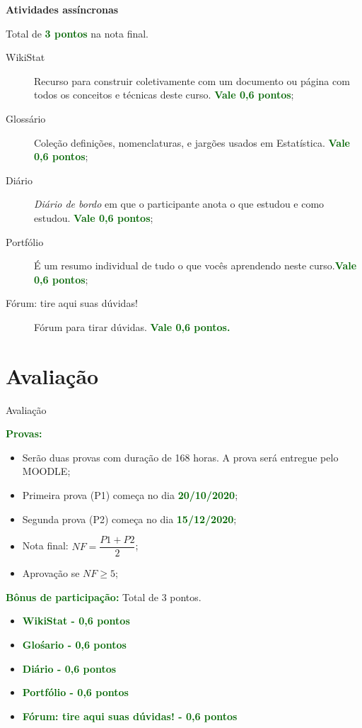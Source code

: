 \documentclass[9pt]{beamer}
\newcommand{\cc}[1]{\textcolor{darkgreen}{\bf #1}}
\begin{document}
\begin{frame}{}

\textbf{Atividades assíncronas}
\vfill


Total de \textcolor{darkgreen}{\bf 3 pontos} na nota final.
\begin{description}
	\item[WikiStat] Recurso para construir coletivamente com um documento ou página com todos os conceitos e técnicas deste curso. \textcolor{darkgreen}{\bf Vale 0,6 pontos};
	\item[Glossário] Coleção definições, nomenclaturas, e jargões usados em Estatística. \textcolor{darkgreen}{\bf Vale 0,6 pontos};
	\item[Diário] \textit{Diário de bordo} em que o participante anota o que estudou e como estudou. \textcolor{darkgreen}{\bf  Vale 0,6 pontos};
	\item[Portfólio] É um resumo individual de tudo o que vocês aprendendo neste curso.\textcolor{darkgreen}{\bf Vale 0,6 pontos};
	\item[Fórum: tire aqui suas dúvidas!] Fórum para tirar dúvidas. \textcolor{darkgreen}{\bf Vale 0,6 pontos.}
\end{description}


\normalsize
\end{frame}

\section{Avaliação}

\begin{frame}{Avaliação}

\cc{Provas:}

\begin{itemize}
	\item Serão duas provas com duração de 168 horas. A prova será entregue pelo MOODLE;
	\vfill
	
	\item Primeira prova (P1) começa no dia \cc{20/10/2020};
	\vfill
	
	\item Segunda prova (P2) começa no dia \cc{15/12/2020};
	\vfill
	
	\item Nota final: $NF = \dfrac{P1 + P2}{2}$;
	\vfill
	
	\item Aprovação se $NF \geq 5$;
\end{itemize}
\vfill

\cc{Bônus de participação:} Total de 3 pontos. 
\begin{itemize}
	\item \cc{WikiStat - 0,6 pontos}
	\item \cc{Glośario - 0,6 pontos}
	\item \cc{Diário - 0,6 pontos}
	\item \cc{Portfólio - 0,6 pontos}
	\item \cc{Fórum: tire aqui suas dúvidas! - 0,6 pontos}
\end{itemize}
\end{frame}
\end{document}
